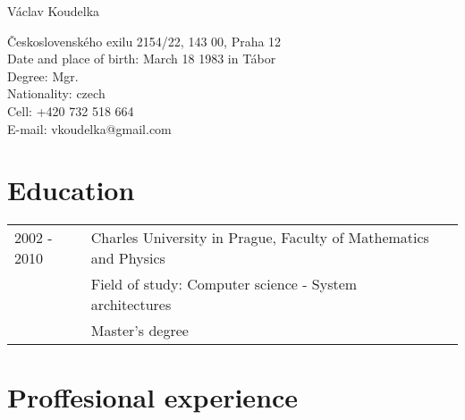 \documentclass[11pt,letterpaper]{article}
\def\name{Václav Koudelka}
\begin{document}
{\huge \name}


\vspace{0.25in}

\begin{minipage}[t]{0.8\textwidth} 
  Československého exilu 2154/22, 143 00, Praha 12\\
  Date and place of birth: March 18 1983 in Tábor \\
  Degree: Mgr. \\
  Nationality: czech \\
  Cell: +420 732 518 664 \\
  E-mail: vkoudelka@gmail.com \\
\end{minipage}

\section*{Education}

\begin{tabular}{lll}
2002 - 2010 & Charles University in Prague, Faculty of Mathematics and Physics \\
      & Field of study: Computer science - System architectures \\
      & Master's degree       
\end{tabular}

\section*{Proffesional experience}
\end{document}
